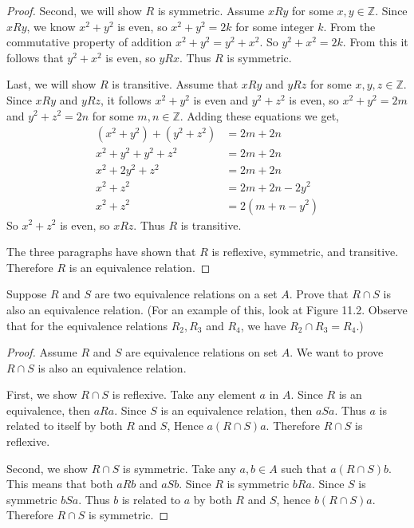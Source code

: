 \documentclass[DIN, pagenumber=false, fontsize=11pt, parskip=half]{scrartcl}
\begin{document}
\begin{problems}
\begin{proof}
        Second, we will show $R$ is symmetric. Assume $xRy$ for some $x,y \in \mathbb{Z}$. Since $xRy$, we know $x^2+y^2$ is even, so $x^2+y^2 = 2k$ for some integer $k$. From the commutative property of addition $x^2+y^2 = y^2+x^2$. So $y^2+x^2 = 2k$. From this it follows that $y^2+x^2$ is even, so $yRx$.
        Thus $R$ is symmetric.

        Last, we will show $R$ is transitive. Assume that $xRy$ and $yRz$ for some $x,y,z \in \mathbb{Z}$. Since $xRy$ and $yRz$, it follows $x^2+y^2$ is even and $y^2+z^2$ is even, so $x^2+y^2 = 2m$ and $y^2+z^2 = 2n$ for some $m,n \in \mathbb{Z}$. Adding these equations we get,
        \begin{align*}
            (x^2+y^2) + (y^2+z^2) &= 2m + 2n\\ 
            x^2+y^2+y^2+z^2 &= 2m + 2n\\ 
            x^2+2y^2+z^2 &= 2m + 2n\\ 
            x^2+z^2 &= 2m + 2n - 2y^2\\ 
            x^2+z^2 &= 2(m+n-y^2)
        \end{align*}
        So $x^2+z^2$ is even, so $xRz$. Thus $R$ is transitive.
        
        The three paragraphs have shown that $R$ is reflexive, symmetric, and transitive. Therefore $R$ is an equivalence relation.
    \end{proof}

    \problem Suppose $R$ and $S$ are two equivalence relations on a set $A$. Prove that $R \cap S$ is also an equivalence relation. (For an example of this, look at Figure 11.2. Observe that for the equivalence relations $R_2, R_3$ and $R_4$, we have $R_2 \cap R_3 = R_4$.)

    \begin{proof}
        Assume $R$ and $S$ are equivalence relations on set $A$. We want to prove $R \cap S$ is also an equivalence relation.

        First, we show $R \cap S$ is reflexive. Take any element $a$ in $A$.
        Since $R$ is an equivalence, then $aRa$.
        Since $S$ is an equivalence relation, then $aSa$.
        Thus $a$ is related to itself by both $R$ and $S$, Hence $a (R \cap S) a$. Therefore $R \cap S$ is reflexive.

        Second, we show $R \cap S$ is symmetric. Take any $a,b \in A$ such that $a(R \cap S)b$. This means that both $aRb$ and $aSb$.
        Since $R$ is symmetric $bRa$.
        Since $S$ is symmetric $bSa$.
        Thus $b$ is related to $a$ by both $R$ and $S$, hence $b (R \cap S) a$.
        Therefore $R \cap S$ is symmetric.


\end{proof}
\end{problems}
\end{document}

